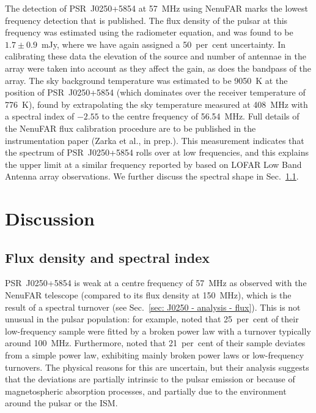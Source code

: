 The detection of PSR~J0250+5854 at 57~MHz using NenuFAR marks the lowest frequency detection that is published. The flux density of the pulsar at this frequency was estimated using the radiometer equation, and was found to be $1.7\pm0.9$~mJy, where we have again assigned a 50~per~cent uncertainty. In calibrating these data the elevation of the source and number of antennae in the array were taken into account as they affect the gain, as does the bandpass of the array. The sky background temperature was estimated to be 9050~K at the position of PSR~J0250+5854 (which dominates over the receiver temperature of 776~K), found by extrapolating the sky temperature measured at 408~MHz \citep{HSSW1982} with a spectral index of $-2.55$ \citep{LMOP1987, RRxx1988} to the centre frequency of 56.54~MHz. Full details of the NenuFAR flux calibration procedure are to be published in the instrumentation paper (Zarka et al., in prep.). This measurement indicates that the spectrum of PSR~J0250+5854 rolls over at low frequencies, and this explains the upper limit at a similar frequency reported by \citet{TBC+2018} based on LOFAR Low Band Antenna array observations. We further discuss the spectral shape in Sec.~\ref{sec: J0250 - discussion - flux}.

\section{Discussion}
\label{sec: J0250 - discussion}

\subsection{Flux density and spectral index}
\label{sec: J0250 - discussion - flux}

PSR~J0250+5854 is weak at a centre frequency of 57~MHz as observed with the NenuFAR telescope (compared to its flux density at 150~MHz), which is the result of a spectral turnover (see Sec.~\ref{sec: J0250 - analysis - flux}). This is not unusual in the pulsar population: for example, \citet{BKK+2016} noted that 25~per~cent of their low-frequency sample were fitted by a broken power law with a turnover typically around 100~MHz. Furthermore, \citet{JSK+2018} noted that 21~per~cent of their sample deviates from a simple power law, exhibiting mainly broken power laws or low-frequency turnovers. The physical reasons for this are uncertain, but their analysis suggests that the deviations are partially intrinsic to the pulsar emission or because of magnetospheric absorption processes, and partially due to the environment around the pulsar or the ISM. 

